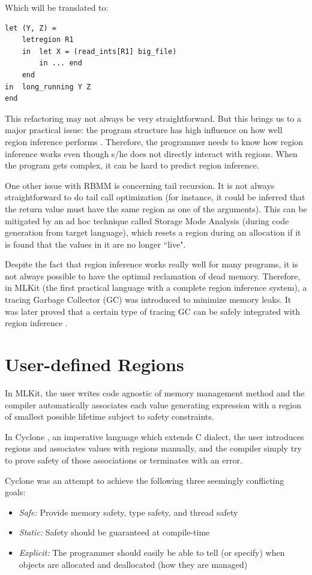 \documentclass[11pt]{report}
\begin{document}
\noindent Which will be translated to:

\begin{lstlisting}
let (Y, Z) =
    letregion R1
    in  let X = (read_ints[R1] big_file)
        in ... end
    end
in  long_running Y Z
end
\end{lstlisting}

This refactoring may not always be very straightforward. But this brings us to a major practical issue: the program structure has high influence on how well region inference performs \cite{regionretro}. Therefore, the programmer needs to know how region inference works even though s/he does not directly interact with regions. When the program gets complex, it can be hard to predict region inference.

One other issue with RBMM is concerning tail recursion. It is not always straightforward to do tail call optimization (for instance, it could be inferred that the return value must have the same region as one of the arguments). This can be mitigated by an ad hoc technique called Storage Mode Analysis (during code generation from target language), which resets a region during an allocation if it is found that the values in it are no longer ``live".

Despite the fact that region inference works really well for many programs, it is not always possible to have the optimal reclamation of dead memory. Therefore, in MLKit\cite{mlkitgh} (the first practical language with a complete region inference system), a tracing Garbage Collector (GC) was introduced \cite{elsmanthesis} to minimize memory leaks. It was later proved that a certain type of tracing GC can be safely integrated with region inference \cite{elsmangc}.

\chapter{User-defined Regions}

In MLKit, the user writes code agnostic of memory management method and the compiler automatically associates each value generating expression with a region of smallest possible lifetime subject to safety constraints.

In Cyclone \cite{grossmanrbmm}, an imperative language which extends C dialect, the user introduces regions and associates values with regions manually, and the compiler simply try to prove safety of those associations or terminates with an error.

Cyclone was an attempt to achieve the following three seemingly conflicting goals:
\begin{itemize}
\item \textit{Safe:} Provide memory safety, type safety, and thread safety
\item \textit{Static:} Safety should be guaranteed at compile-time
\item \textit{Explicit:} The programmer should easily be able to tell (or specify) when objects are allocated and deallocated (how they are managed)
\end{itemize}
\end{document}
